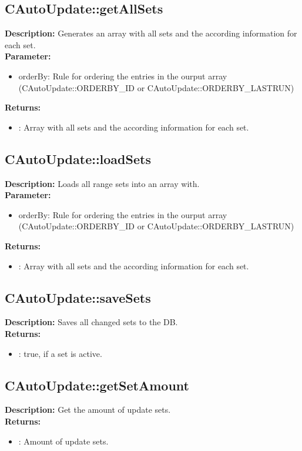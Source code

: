 \subsection{CAutoUpdate::getAllSets}
\textbf{Description:} Generates an array with all sets and the according information for each set.\\
\textbf{Parameter:}
\begin{itemize}
\item orderBy: Rule for ordering the entries in the ourput array (CAutoUpdate::ORDERBY\_ID or CAutoUpdate::ORDERBY\_LASTRUN)
\end{itemize}
\textbf{Returns:}
\begin{itemize}
\item : Array with all sets and the according information for each set.
\end{itemize}

\subsection{CAutoUpdate::loadSets}
\textbf{Description:} Loads all range sets into an array with.\\
\textbf{Parameter:}
\begin{itemize}
\item orderBy: Rule for ordering the entries in the ourput array (CAutoUpdate::ORDERBY\_ID or CAutoUpdate::ORDERBY\_LASTRUN)
\end{itemize}
\textbf{Returns:}
\begin{itemize}
\item : Array with all sets and the according information for each set.
\end{itemize}

\subsection{CAutoUpdate::saveSets}
\textbf{Description:} Saves all changed sets to the DB.\\
\textbf{Returns:}
\begin{itemize}
\item : true, if a set is active.
\end{itemize}

\subsection{CAutoUpdate::getSetAmount}
\textbf{Description:} Get the amount of update sets.\\
\textbf{Returns:}
\begin{itemize}
\item : Amount of update sets.
\end{itemize}


